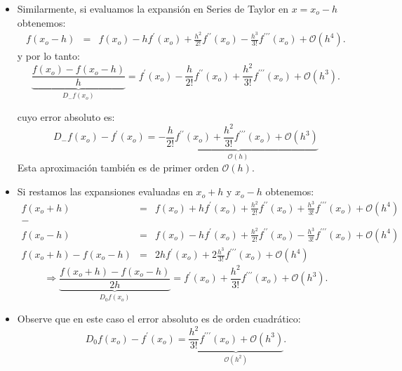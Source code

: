 \documentclass{beamer}
\begin{document}
\begin{frame}
\begin{itemize}
\item Similarmente, si evaluamos la expansión en Series de Taylor en $x = x_o-h$ obtenemos:
\begin{eqnarray*}
	f(x_o-h) & = & f(x_o) - h f^\prime(x_o) + \frac{h^2}{2!}f^{\prime\prime}(x_o)
	- \frac{h^3}{3!}f^{\prime\prime\prime}(x_o) + \mathcal{O}(h^4). 	
\end{eqnarray*}
 y por lo tanto:
	\[
	\underbrace{\frac{f(x_o)-f(x_o-h)}{h}}_{D_-f(x_o)} = f^\prime(x_o) - \frac{h}{2!}f^{\prime\prime}(x_o)
	+ \frac{h^2}{3!}f^{\prime\prime\prime}(x_o) + \mathcal{O}(h^3). 
	\]
	
 cuyo error absoluto es:
	\[ 
	D_-f(x_o) - f^\prime(x_o) = \underbrace{-\frac{h}{2!}f^{\prime\prime}(x_o)
		+ \frac{h^2}{3!}f^{\prime\prime\prime}(x_o) + \mathcal{O}(h^3)}_{\mathcal{O}(h)}
	\]
%
Esta aproximación también es de primer orden $\mathcal{O}(h)$.
\end{itemize}
\end{frame}

\begin{frame}
\begin{itemize}
\item Si restamos las expansiones evaluadas en $x_o+h$ y $x_o-h$ obtenemos:
{\footnotesize 
	\begin{eqnarray*}
	f(x_o+h) & = & f(x_o) + h f^\prime(x_o) + \frac{h^2}{2!}f^{\prime\prime}(x_o)
	+ \frac{h^3}{3!}f^{\prime\prime\prime}(x_o) + \mathcal{O}(h^4) \\ -\quad \qquad \qquad & &\\
	f(x_o-h) & = & f(x_o) - h f^\prime(x_o) + \frac{h^2}{2!}f^{\prime\prime}(x_o)
	- \frac{h^3}{3!}f^{\prime\prime\prime}(x_o) + \mathcal{O}(h^4) \\
	\hline
	f(x_o+h) - f(x_o-h) & = & 2 h f^\prime(x_o) + 2\frac{h^3}{3!}f^{\prime\prime\prime}(x_o) + \mathcal{O}(h^4)
\end{eqnarray*}
\[
\Longrightarrow \underbrace{\frac{f(x_o+h) - f(x_o-h)}{2h}}_{D_0 f(x_o)} = f^\prime(x_o) + \frac{h^2}{3!}f^{\prime\prime\prime}(x_o) + \mathcal{O}(h^3). 
\]
}
\item Observe que en este caso el error absoluto es de orden cuadrático:
{\small
\[
D_0 f(x_o) - f^\prime(x_o)  = \underbrace{\frac{h^2}{3!}f^{\prime\prime\prime}(x_o) + \mathcal{O}(h^3)}_{\mathcal{O}(h^2)}. 
\]
}
\end{itemize}
\end{frame}
\end{document}
